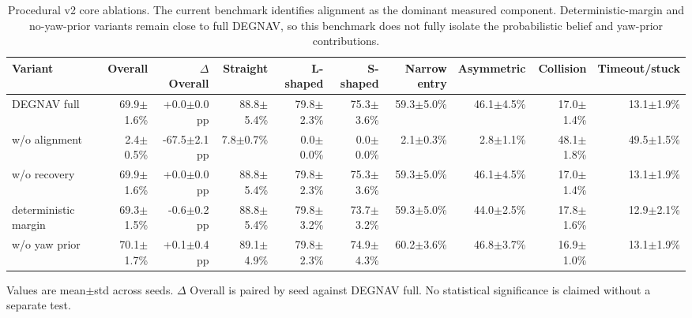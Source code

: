 \begin{table}[t]
\centering
\small
\caption{Procedural v2 core ablations. The current benchmark identifies alignment as the dominant measured component. Deterministic-margin and no-yaw-prior variants remain close to full DEGNAV, so this benchmark does not fully isolate the probabilistic belief and yaw-prior contributions.}
\label{tab:procedural-v2-core-ablation}
\begin{tabular}{lrrrrrrrrr}
\toprule
Variant & Overall & $\Delta$ Overall & Straight & L-shaped & S-shaped & Narrow entry & Asymmetric & Collision & Timeout/stuck \\
\midrule
DEGNAV full & 69.9$\pm$1.6\% & +0.0$\pm$0.0 pp & 88.8$\pm$5.4\% & 79.8$\pm$2.3\% & 75.3$\pm$3.6\% & 59.3$\pm$5.0\% & 46.1$\pm$4.5\% & 17.0$\pm$1.4\% & 13.1$\pm$1.9\% \\
w/o alignment & 2.4$\pm$0.5\% & -67.5$\pm$2.1 pp & 7.8$\pm$0.7\% & 0.0$\pm$0.0\% & 0.0$\pm$0.0\% & 2.1$\pm$0.3\% & 2.8$\pm$1.1\% & 48.1$\pm$1.8\% & 49.5$\pm$1.5\% \\
w/o recovery & 69.9$\pm$1.6\% & +0.0$\pm$0.0 pp & 88.8$\pm$5.4\% & 79.8$\pm$2.3\% & 75.3$\pm$3.6\% & 59.3$\pm$5.0\% & 46.1$\pm$4.5\% & 17.0$\pm$1.4\% & 13.1$\pm$1.9\% \\
deterministic margin & 69.3$\pm$1.5\% & -0.6$\pm$0.2 pp & 88.8$\pm$5.4\% & 79.8$\pm$3.2\% & 73.7$\pm$3.2\% & 59.3$\pm$5.0\% & 44.0$\pm$2.5\% & 17.8$\pm$1.6\% & 12.9$\pm$2.1\% \\
w/o yaw prior & 70.1$\pm$1.7\% & +0.1$\pm$0.4 pp & 89.1$\pm$4.9\% & 79.8$\pm$2.3\% & 74.9$\pm$4.3\% & 60.2$\pm$3.6\% & 46.8$\pm$3.7\% & 16.9$\pm$1.0\% & 13.1$\pm$1.9\% \\
\bottomrule
\end{tabular}
\vspace{0.25em}
\begin{minipage}{0.98\linewidth}
\footnotesize Values are mean$\pm$std across seeds. $\Delta$ Overall is paired by seed against DEGNAV full. No statistical significance is claimed without a separate test.
\end{minipage}
\end{table}
